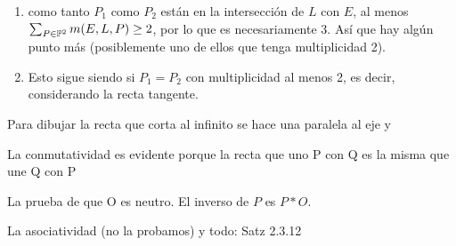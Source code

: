 \documentclass[CR.tex]{subfiles}
\begin{document}
\begin{coro}[Korollar 2.3.9]
\begin{enumerate}
\item como tanto $P_1$ como $P_2$ están en la intersección de $L$ con $E$, al menos $\sum_{P\in\mathbb{P}^2}m(E,L,P)\geq 2$, por lo que es necesariamente 3. Así que hay algún punto más (posiblemente uno de ellos que tenga multiplicidad 2). 
\item Esto sigue siendo si $P_1=P_2$ con multiplicidad al menos 2, es decir, considerando la recta tangente. 
\end{enumerate}
\end{coro}

\begin{defi}[Definition 2.3.10]

\end{defi}
Para dibujar la recta que corta al infinito se hace una paralela al eje y

La conmutatividad es evidente porque la recta que uno P con Q es la misma que une Q con P


La prueba de que O es neutro. El inverso de $P$ es $P*O$. 


La asociatividad (no la probamos) y todo: Satz 2.3.12
\end{document}
